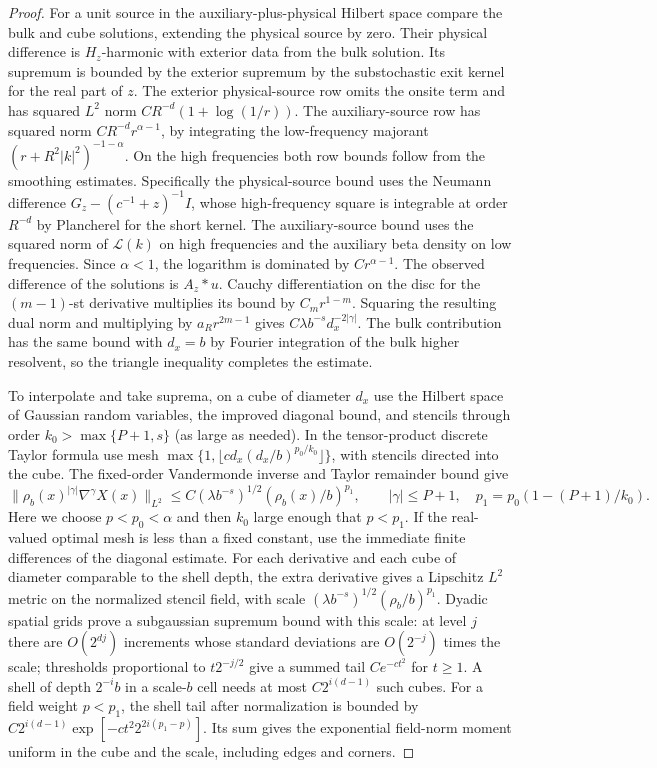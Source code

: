 \documentclass[11pt]{article}
\theoremstyle{definition}
\begin{document}
\begin{proof}
For a unit source in the auxiliary-plus-physical Hilbert
space compare the bulk and cube solutions, extending the
physical source by zero. Their physical difference is
\(H_z\)-harmonic with exterior data from the bulk solution.
Its supremum is bounded by the exterior supremum by the
substochastic exit kernel for the real part of \(z\).
The exterior physical-source row omits the onsite term and
has squared \(L^2\) norm \(C R^{-d}(1+\log(1/r))\).
The auxiliary-source row has squared norm
\(C R^{-d}r^{\alpha-1}\), by integrating the low-frequency
majorant \((r+R^2|k|^2)^{-1-\alpha}\). On the high frequencies
both row bounds follow from the smoothing estimates.
Specifically the physical-source bound uses the Neumann
difference \(G_z-(c^{-1}+z)^{-1}I\), whose high-frequency
square is integrable at order \(R^{-d}\) by Plancherel for
the short kernel. The auxiliary-source bound uses the
squared norm of \(\mathcal L(k)\) on high frequencies
and the auxiliary beta density on low frequencies.
Since \(\alpha<1\), the logarithm is dominated by
\(Cr^{\alpha-1}\). The observed difference of the solutions
is \(A_z*u\). Cauchy differentiation on the disc for the
\((m-1)\)-st derivative multiplies its bound by
\(C_m r^{1-m}\). Squaring the resulting dual norm and
multiplying by \(a_R r^{2m-1}\) gives
\(C\lambda b^{-s}d_x^{-2|\gamma|}\).
The bulk contribution has the same bound with \(d_x=b\)
by Fourier integration of the bulk higher resolvent, so
the triangle inequality completes the estimate.

To interpolate and take suprema, on a cube of diameter
\(d_x\) use the Hilbert space of Gaussian random variables,
the improved diagonal bound, and stencils through order
\(k_0>\max\{P+1,s\}\) (as large as needed). In the tensor-product discrete Taylor
formula use mesh \(\max\{1,\lfloor c d_x (d_x/b)^{p_0/k_0}\rfloor\}\),
with stencils directed into the cube. The fixed-order
Vandermonde inverse and Taylor remainder bound give
\begin{equation}
 \|\rho_b(x)^{|\gamma|}\nabla^\gamma X(x)\|_{L^2}
 \le C(\lambda b^{-s})^{1/2}(\rho_b(x)/b)^{p_1},
 \qquad |\gamma|\le P+1,\quad
 p_1=p_0(1-(P+1)/k_0).
\end{equation}
Here we choose \(p<p_0<\alpha\) and then \(k_0\) large enough that
\(p<p_1\).
If the real-valued optimal mesh is less than a fixed constant,
use the immediate finite differences of the diagonal estimate.
For each derivative and each cube of diameter comparable to
the shell depth, the extra derivative gives a Lipschitz
\(L^2\) metric on the normalized stencil field, with scale
\((\lambda b^{-s})^{1/2}(\rho_b/b)^{p_1}\).
Dyadic spatial grids prove a subgaussian supremum bound
with this scale: at level \(j\) there are \(O(2^{dj})\)
increments whose standard deviations are \(O(2^{-j})\)
times the scale; thresholds proportional to \(t2^{-j/2}\)
give a summed tail \(C e^{-c t^2}\) for \(t\ge1\).
A shell of depth \(2^{-i}b\) in a scale-\(b\) cell needs
at most \(C2^{i(d-1)}\) such cubes. For a field weight
\(p<p_1\), the shell tail after normalization is bounded
by \(C2^{i(d-1)}\exp[-ct^2 2^{2i(p_1-p)}]\).
Its sum gives the exponential field-norm moment uniform
in the cube and the scale, including edges and corners.
\end{proof}
\end{document}
